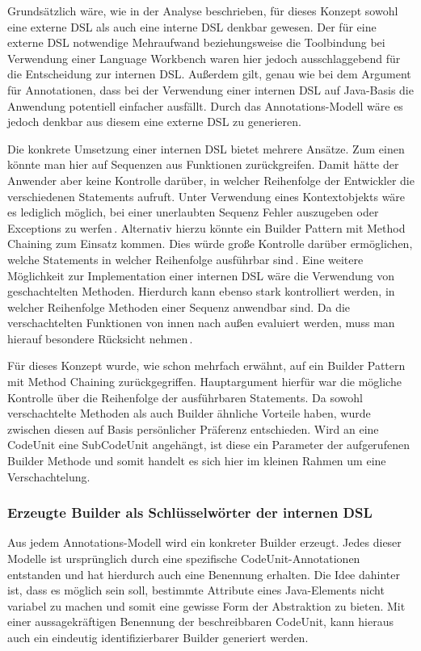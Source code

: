 \documentclass[12pt,oneside,a4paper,parskip]{scrbook}
\begin{document}
Grundsätzlich wäre, wie in der Analyse beschrieben, für dieses Konzept sowohl eine externe DSL als auch eine interne DSL denkbar gewesen. Der für eine externe DSL notwendige Mehraufwand beziehungsweise die Toolbindung bei Verwendung einer Language Workbench waren hier jedoch ausschlaggebend für die Entscheidung zur internen DSL. Außerdem gilt, genau wie bei dem Argument für Annotationen, dass bei der Verwendung einer internen DSL auf Java-Basis die Anwendung potentiell einfacher ausfällt. Durch das Annotations-Modell wäre es jedoch denkbar aus diesem eine externe DSL zu generieren.

Die konkrete Umsetzung einer internen DSL bietet mehrere Ansätze. Zum einen könnte man hier auf Sequenzen aus Funktionen zurückgreifen. Damit hätte der Anwender aber keine Kontrolle darüber, in welcher Reihenfolge der Entwickler die verschiedenen Statements aufruft. Unter Verwendung eines Kontextobjekts wäre es lediglich möglich, bei einer unerlaubten Sequenz Fehler auszugeben oder Exceptions zu werfen\,\cite[S.\,351ff.]{fowler2010}. Alternativ hierzu könnte ein Builder Pattern mit Method Chaining zum Einsatz kommen. Dies würde große Kontrolle darüber ermöglichen, welche Statements in welcher Reihenfolge ausführbar sind\,\cite[S.\,343ff.]{fowler2010}. Eine weitere Möglichkeit zur Implementation einer internen DSL wäre die Verwendung von geschachtelten Methoden. Hierdurch kann ebenso stark kontrolliert werden, in welcher Reihenfolge Methoden einer Sequenz anwendbar sind. Da die verschachtelten Funktionen von innen nach außen evaluiert werden, muss man hierauf besondere Rücksicht nehmen\,\cite[S.\,357ff.]{fowler2010}.

Für dieses Konzept wurde, wie schon mehrfach erwähnt, auf ein Builder Pattern mit Method Chaining zurückgegriffen. Hauptargument hierfür war die mögliche Kontrolle über die Reihenfolge der ausführbaren Statements. Da sowohl verschachtelte Methoden als auch Builder ähnliche Vorteile haben, wurde zwischen diesen auf Basis persönlicher Präferenz entschieden. Wird an eine CodeUnit eine SubCodeUnit angehängt, ist diese ein Parameter der aufgerufenen Builder Methode und somit handelt es sich hier im kleinen Rahmen um eine Verschachtelung.

\subsubsection{Erzeugte Builder als Schlüsselwörter der internen DSL}

Aus jedem Annotations-Modell wird ein konkreter Builder erzeugt. Jedes dieser Modelle ist ursprünglich durch eine spezifische CodeUnit-Annotationen entstanden und hat hierdurch auch eine Benennung erhalten. Die Idee dahinter ist, dass es möglich sein soll, bestimmte Attribute eines Java-Elements nicht variabel zu machen und somit eine gewisse Form der Abstraktion zu bieten. Mit einer aussagekräftigen Benennung der beschreibbaren CodeUnit, kann hieraus auch ein eindeutig identifizierbarer Builder generiert werden.
\end{document}
